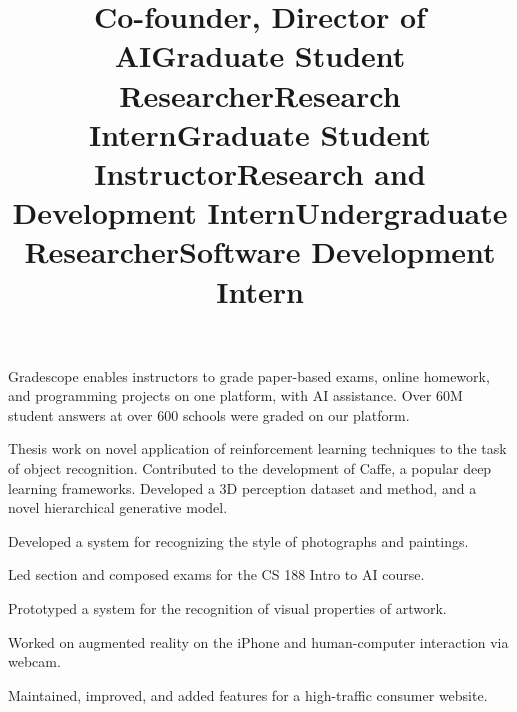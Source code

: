 \documentclass[line, margin]{res}
\begin{document}
\begin{resume}
\title{\bf Co-founder, Director of AI}
\begin{position}
Gradescope enables instructors to grade paper-based exams, online homework, and programming projects on one platform, with AI assistance.
Over 60M student answers at over 600 schools were graded on our platform.
\end{position}

\title{\bf Graduate Student Researcher}
\begin{position}
Thesis work on novel application of reinforcement learning techniques to the task of object recognition.
Contributed to the development of Caffe, a popular deep learning frameworks.
Developed a 3D perception dataset and method, and a novel hierarchical generative model.
\end{position}

\title{\bf Research Intern}
\begin{position}
Developed a system for recognizing the style of photographs and paintings.
\end{position}

\title{\bf Graduate Student Instructor}
\begin{position}
Led section and composed exams for the CS 188 Intro to AI course.
\end{position}

\title{\bf Research and Development Intern}
\begin{position}
Prototyped a system for the recognition of visual properties of artwork.
\end{position}

\title{\bf Undergraduate Researcher}
\begin{position}
Worked on augmented reality on the iPhone and human-computer interaction via webcam.
\end{position}

\title{\bf Software Development Intern}
\begin{position}
Maintained, improved, and added features for a high-traffic consumer website.
\end{position}


\end{resume}
\end{document}
